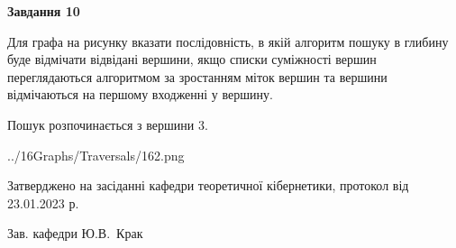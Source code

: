 \documentclass[12pt, ukrainian]{article}
\begin{document}
{\begin {large}
{\begin {center}\textbf{Завдання 10}\end {center}}\par
Для графа на рисунку вказати послідовність, в якій алгоритм пошуку в глибину буде відмічати відвідані вершини, якщо списки суміжності вершин переглядаються алгоритмом за зростанням міток вершин та вершини відмічаються на першому вход\-женні у вершину.\par
Пошук розпочинається з вершини 3.\par

\begin{center}
	{../16Graphs/Traversals/162.png}
\end{center}\par
\newpage


\end {large}
}
{\smallskip \begin {small} Затверджено на засіданні кафедри теоретичної кібернетики, протокол  від   23.01.2023 р.\par\smallskip\smallskip
{\parbox {6.5 cm}{Зав. кафедри \dotfill Ю.В.~Крак}} \end{small}}
\end{document}
